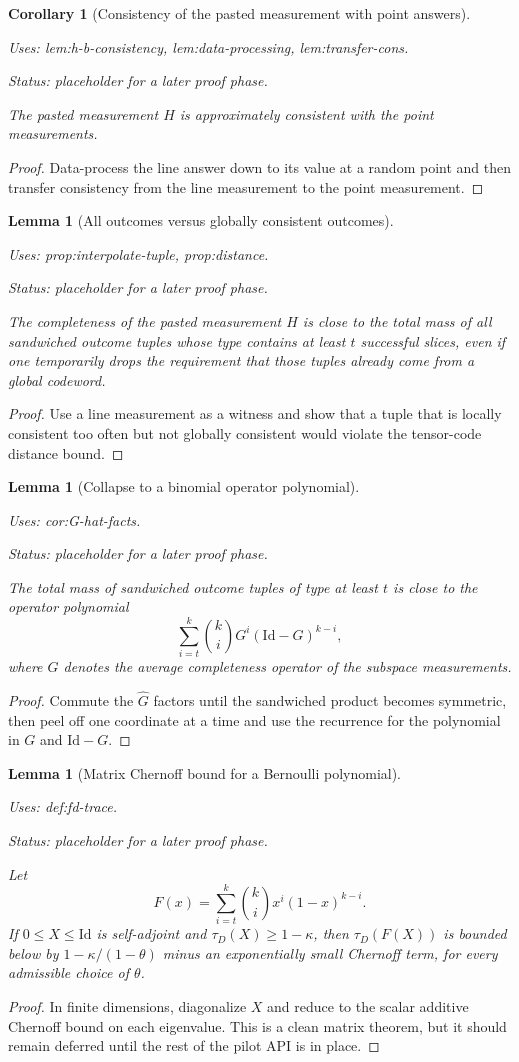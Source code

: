 \documentclass{article}
\providecommand{\uses}[1]{\par\smallskip\noindent\emph{Uses:} #1.\par\smallskip}
\providecommand{\notready}{\par\smallskip\noindent\emph{Status: placeholder for a later proof phase.}\par\smallskip}
\newtheorem{lemma}[definition]{Lemma}
\newtheorem{corollary}[definition]{Corollary}
\theoremstyle{remark}
\newcommand{\id}{\mathrm{Id}}
\begin{document}
\begin{corollary}[Consistency of the pasted measurement with point answers]\label{cor:ha-cons}
  \uses{lem:h-b-consistency, lem:data-processing, lem:transfer-cons}
  \notready
  The pasted measurement $H$ is approximately consistent with the point measurements.
\end{corollary}
\begin{proof}
  Data-process the line answer down to its value at a random point and then transfer consistency from the line measurement to the point measurement.
\end{proof}

\begin{lemma}[All outcomes versus globally consistent outcomes]\label{lem:over-all-outcomes}
  \uses{prop:interpolate-tuple, prop:distance}
  \notready
  The completeness of the pasted measurement $H$ is close to the total mass of all sandwiched outcome tuples whose type contains at least $t$ successful slices, even if one temporarily drops the requirement that those tuples already come from a global codeword.
\end{lemma}
\begin{proof}
  Use a line measurement as a witness and show that a tuple that is locally consistent too often but not globally consistent would violate the tensor-code distance bound.
\end{proof}

\begin{lemma}[Collapse to a binomial operator polynomial]\label{lem:from-H-to-G}
  \uses{cor:G-hat-facts}
  \notready
  The total mass of sandwiched outcome tuples of type at least $t$ is close to the operator polynomial
  \[
    \sum_{i=t}^k \binom{k}{i} G^i(\id-G)^{k-i},
  \]
  where $G$ denotes the average completeness operator of the subspace measurements.
\end{lemma}
\begin{proof}
  Commute the $\widehat G$ factors until the sandwiched product becomes symmetric, then peel off one coordinate at a time and use the recurrence for the polynomial in $G$ and $\id-G$.
\end{proof}

\begin{lemma}[Matrix Chernoff bound for a Bernoulli polynomial]\label{lem:chernoff-bernoulli-matrix}
  \uses{def:fd-trace}
  \notready
  Let
  \[
    F(x)=\sum_{i=t}^k \binom{k}{i}x^i(1-x)^{k-i}.
  \]
  If $0\le X\le \id$ is self-adjoint and $\tau_D(X)\ge 1-\kappa$, then $\tau_D(F(X))$ is bounded below by $1-\kappa/(1-\theta)$ minus an exponentially small Chernoff term, for every admissible choice of $\theta$.
\end{lemma}
\begin{proof}
  In finite dimensions, diagonalize $X$ and reduce to the scalar additive Chernoff bound on each eigenvalue. This is a clean matrix theorem, but it should remain deferred until the rest of the pilot API is in place.
\end{proof}
\end{document}
